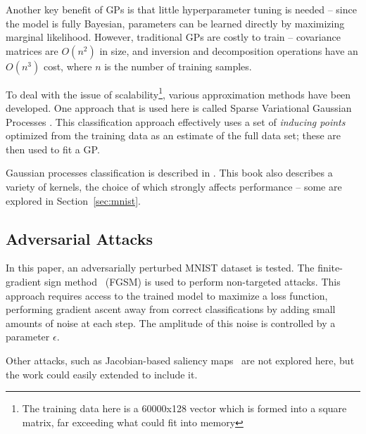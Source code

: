 \documentclass{article}
\begin{document}
Another key benefit of GPs is that little hyperparameter tuning is needed -- since the model is fully Bayesian, parameters can be learned directly by maximizing marginal likelihood. However, traditional GPs are costly to train -- covariance matrices are $O(n^2)$ in size, and inversion and decomposition operations have an $O(n^3)$ cost, where $n$ is the number of training samples.

To deal with the issue of scalability\footnote{The training data here is a 60000x128 vector which is formed into a square matrix, far exceeding what could fit into memory}, various approximation methods have been developed. One approach that is used here is called Sparse Variational Gaussian Processes \cite{hensman2015scalable}. This classification approach effectively uses a set of \textit{inducing points} optimized from the training data as an estimate of the full data set; these are then used to fit a GP.

Gaussian processes classification is described in \citet*{rasmussen2006gaussian}. This book also describes a variety of kernels, the choice of which strongly affects performance -- some are explored in Section~\ref{sec:mnist}. 

\subsection{Adversarial Attacks}
\label{sec:background:adv}
% 
In this paper, an adversarially perturbed MNIST dataset is tested. The finite-gradient sign method~\cite{goodfellow2014explaining} (FGSM) is used to perform non-targeted attacks. This approach requires access to the trained model to maximize a loss function, performing gradient ascent away from correct classifications by adding small amounts of noise at each step. The amplitude of this noise is controlled by a parameter $\epsilon$.

Other attacks, such as Jacobian-based saliency maps~\cite{papernot2016limitations} are not explored here, but the work could easily extended to include it.


  
\end{document}
